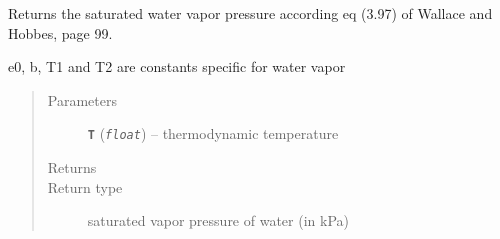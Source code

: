 \documentclass[a4paper,10pt,oneside]{sphinxmanual}
\begin{document}

\begin{fulllineitems}
\label{pymicra:pymicra.physics.satWaterPressure}
Returns the saturated water vapor pressure according eq (3.97) of Wallace and Hobbes, page 99.

e0, b, T1 and T2 are constants specific for water vapor
\begin{quote}\begin{description}
\item[{Parameters}] \leavevmode
\textbf{\texttt{T}} (\emph{\texttt{float}}) -- thermodynamic temperature

\item[{Returns}] \leavevmode


\item[{Return type}] \leavevmode
saturated vapor pressure of water (in kPa)

\end{description}\end{quote}

\end{fulllineitems}

\end{document}
